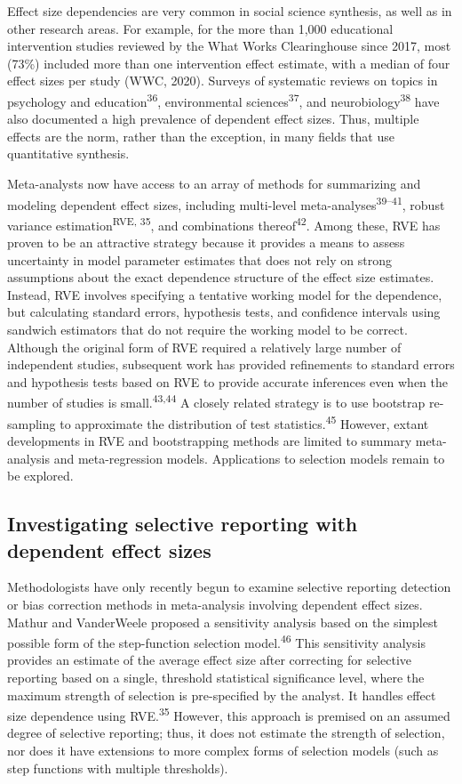 \documentclass[
  man, donotrepeattitle,floatsintext]{apa7}
\begin{document}
Effect size dependencies are very common in social science synthesis, as well as in other research areas.
For example, for the more than 1,000 educational intervention studies reviewed by the What Works Clearinghouse since 2017, most (73\%) included more than one intervention effect estimate, with a median of four effect sizes per study (WWC, 2020).
Surveys of systematic reviews on topics in psychology and education\textsuperscript{36}, environmental sciences\textsuperscript{37}, and neurobiology\textsuperscript{38} have also documented a high prevalence of dependent effect sizes.
Thus, multiple effects are the norm, rather than the exception, in many fields that use quantitative synthesis.

Meta-analysts now have access to an array of methods for summarizing and modeling dependent effect sizes, including multi-level meta-analyses\textsuperscript{39--41}, robust variance estimation\textsuperscript{RVE, 35}, and combinations thereof\textsuperscript{42}.
Among these, RVE has proven to be an attractive strategy because it provides a means to assess uncertainty in model parameter estimates that does not rely on strong assumptions about the exact dependence structure of the effect size estimates.
Instead, RVE involves specifying a tentative working model for the dependence, but calculating standard errors, hypothesis tests, and confidence intervals using sandwich estimators that do not require the working model to be correct.
Although the original form of RVE required a relatively large number of independent studies, subsequent work has provided refinements to standard errors and hypothesis tests based on RVE to provide accurate inferences even when the number of studies is small.\textsuperscript{43,44}
A closely related strategy is to use bootstrap re-sampling to approximate the distribution of test statistics.\textsuperscript{45}
However, extant developments in RVE and bootstrapping methods are limited to summary meta-analysis and meta-regression models.
Applications to selection models remain to be explored.

\subsection{Investigating selective reporting with dependent effect sizes}\label{investigating-selective-reporting-with-dependent-effect-sizes}

Methodologists have only recently begun to examine selective reporting detection or bias correction methods in meta-analysis involving dependent effect sizes.
Mathur and VanderWeele proposed a sensitivity analysis based on the simplest possible form of the step-function selection model.\textsuperscript{46}
This sensitivity analysis provides an estimate of the average effect size after correcting for selective reporting based on a single, threshold statistical significance level, where the maximum strength of selection is pre-specified by the analyst.
It handles effect size dependence using RVE.\textsuperscript{35}
However, this approach is premised on an assumed degree of selective reporting; thus, it does not estimate the strength of selection, nor does it have extensions to more complex forms of selection models (such as step functions with multiple thresholds).
\end{document}
